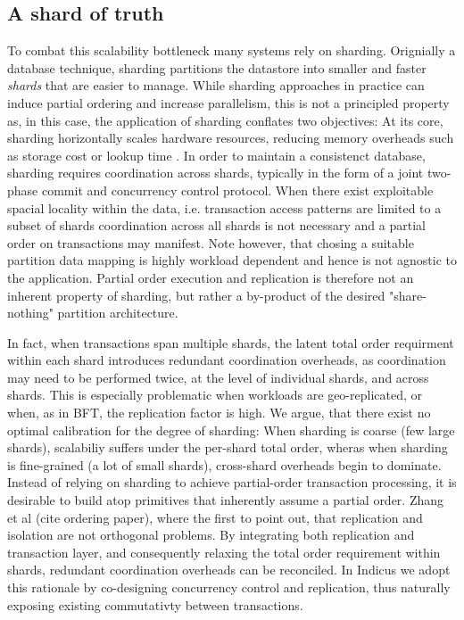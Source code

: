 \subsection{A shard of truth}
To combat this scalability bottleneck many systems rely on sharding. Orignially a database technique, sharding partitions the datastore into smaller and faster \textit{shards} that are easier to manage. While sharding approaches in practice  can induce partial ordering and increase parallelism, this is not a principled property as, in this case, the application of sharding conflates two objectives:
At its core, sharding horizontally scales hardware resources, reducing memory overheads such as storage cost or lookup time . In order to maintain a consistenct database, sharding requires coordination across shards, typically in the form of a joint two-phase commit and concurrency control protocol. 
When there exist exploitable spacial locality within the data, i.e. transaction access patterns are limited to a subset of shards coordination across all shards is not necessary and a partial order on transactions may manifest. Note however, that chosing a suitable partition data mapping is highly workload dependent and hence  is not agnostic to the application.
Partial order execution and replication is therefore not an inherent property of sharding, but rather a by-product of the desired "share-nothing" partition architecture. 

In fact, when transactions span multiple shards, the latent total order requirment within each shard introduces redundant coordination overheads, as coordination may need to be performed twice, at the level of individual shards, and across shards. This is especially problematic when workloads are geo-replicated, or when, as in BFT, the replication factor is high. 
We argue, that there exist no optimal calibration for the degree of sharding: When sharding is coarse (few large shards), scalabiliy suffers under the per-shard total order, wheras when sharding is fine-grained (a lot of small shards), cross-shard overheads begin to dominate. 
Instead of relying on sharding to achieve partial-order transaction processing, it is desirable to build atop primitives that inherently assume a partial order.
Zhang et al (cite ordering paper), where the first to point out, that replication and isolation are not orthogonal problems. By integrating both replication and transaction layer, and consequently relaxing the total order requirement within shards, redundant coordination overheads can be reconciled.
In Indicus we adopt this rationale by co-designing concurrency control and replication, thus naturally exposing existing commutativty between transactions.



